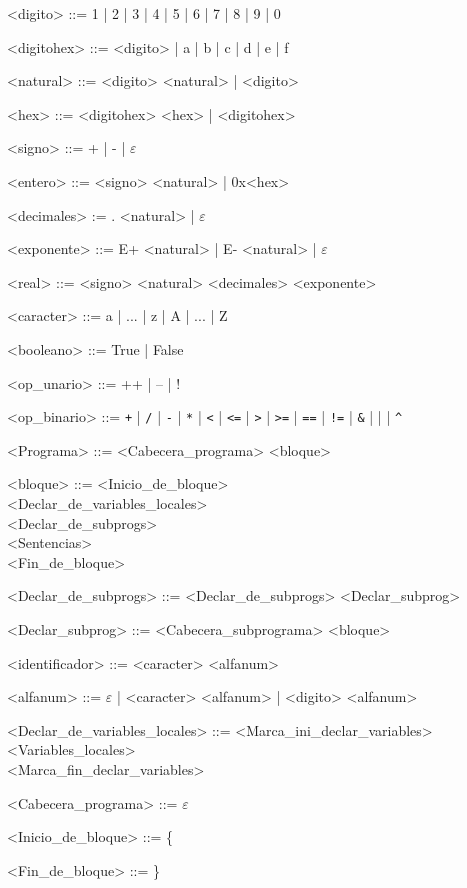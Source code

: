\documentclass{scrartcl}
\begin{document}
\setlength{\grammarparsep}{4pt plus 1pt minus 1pt}
\begin{grammar}

<digito> ::= 1 | 2 | 3 | 4 | 5 | 6 | 7 | 8 | 9 | 0

<digitohex> ::= <digito> | a | b | c | d | e | f

<natural> ::= <digito> <natural> | <digito>

<hex> ::= <digitohex> <hex> | <digitohex>

<signo> ::= + | - | $\varepsilon$

<entero> ::= <signo> <natural> | 0x<hex>

<decimales> := . <natural> | $\varepsilon$

<exponente> ::= E+ <natural> | E- <natural> | $\varepsilon$

<real> ::= <signo> <natural> <decimales> <exponente>

<caracter> ::= a | ... | z | A | ... | Z

<booleano> ::= True | False

<op_unario> ::= ++ | -- | !

<op_binario> ::= \verb|+| | \verb|/| | \verb|-| | \verb|*| | \verb|<| | \verb|<=| | \verb|>| | \verb|>=| | \verb|==| | \verb|!=| | \verb|&| | \verb||| | \verb|^|

<Programa> ::= <Cabecera_programa> <bloque>

<bloque> ::= <Inicio_de_bloque> \\
 <Declar_de_variables_locales> \\
 <Declar_de_subprogs> \\
 <Sentencias> \\
 <Fin_de_bloque>

<Declar_de_subprogs> ::= <Declar_de_subprogs> <Declar_subprog>

<Declar_subprog> ::= <Cabecera_subprograma> <bloque>

<identificador> ::= <caracter> <alfanum>

<alfanum> ::= $\varepsilon$ | <caracter> <alfanum> | <digito> <alfanum>

<Declar_de_variables_locales> ::= <Marca_ini_declar_variables> \\
<Variables_locales> \\
<Marca_fin_declar_variables>

<Cabecera_programa> ::= $\varepsilon$

<Inicio_de_bloque> ::= \{

<Fin_de_bloque> ::= \}


\end{grammar}
\end{document}
